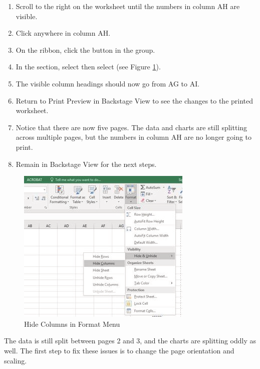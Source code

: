 \begin{enumerate}
	\item Scroll to the right on the worksheet until the numbers in column AH are visible.
	\item Click anywhere in column AH.
	\item On the  ribbon, click the  button in the  group.
	\item In the  section, select  then select  (see Figure \ref{04:fig49}).
	\item The visible column headings should now go from AG to AI.
	\item Return to Print Preview in Backstage View to see the changes to the printed worksheet.
	\item Notice that there are now five pages. The data and charts are still splitting across multiple pages, but the numbers in column AH are no longer going to print.
	\item Remain in Backstage View for the next steps.
\end{enumerate}

\begin{figure}[H]
	\centering
	\includegraphics[width=\maxwidth{.95\linewidth}]{gfx/ch04_fig49}
	\caption{Hide Columns in Format Menu}
	\label{04:fig49}
\end{figure}

The data is still split between pages 2 and 3, and the charts are splitting oddly as well. The first step to fix these issues is to change the page orientation and scaling.

